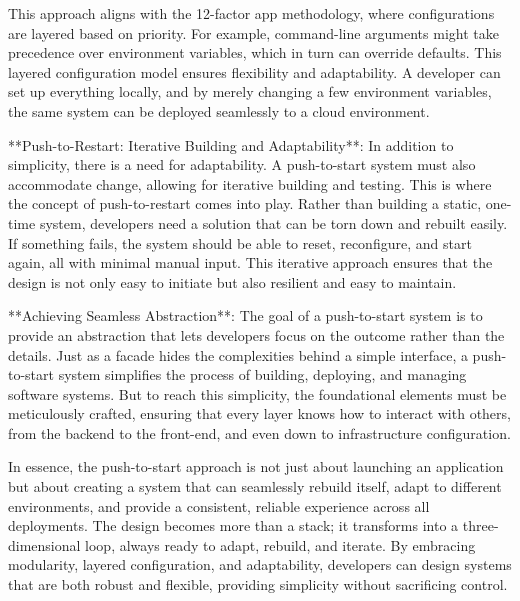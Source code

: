 \documentclass[../../main.tex]{subfiles}
\begin{document}
    This approach aligns with the 12-factor app methodology, where configurations are layered based on priority. For example, command-line arguments might take precedence over environment variables, which in turn can override defaults. This layered configuration model ensures flexibility and adaptability. A developer can set up everything locally, and by merely changing a few environment variables, the same system can be deployed seamlessly to a cloud environment.

    **Push-to-Restart: Iterative Building and Adaptability**: In addition to simplicity, there is a need for adaptability. A push-to-start system must also accommodate change, allowing for iterative building and testing. This is where the concept of push-to-restart comes into play. Rather than building a static, one-time system, developers need a solution that can be torn down and rebuilt easily. If something fails, the system should be able to reset, reconfigure, and start again, all with minimal manual input. This iterative approach ensures that the design is not only easy to initiate but also resilient and easy to maintain.




    **Achieving Seamless Abstraction**: The goal of a push-to-start system is to provide an abstraction that lets developers focus on the outcome rather than the details. Just as a facade hides the complexities behind a simple interface, a push-to-start system simplifies the process of building, deploying, and managing software systems. But to reach this simplicity, the foundational elements must be meticulously crafted, ensuring that every layer knows how to interact with others, from the backend to the front-end, and even down to infrastructure configuration.

    In essence, the push-to-start approach is not just about launching an application but about creating a system that can seamlessly rebuild itself, adapt to different environments, and provide a consistent, reliable experience across all deployments. The design becomes more than a stack; it transforms into a three-dimensional loop, always ready to adapt, rebuild, and iterate. By embracing modularity, layered configuration, and adaptability, developers can design systems that are both robust and flexible, providing simplicity without sacrificing control.

\end{document}
